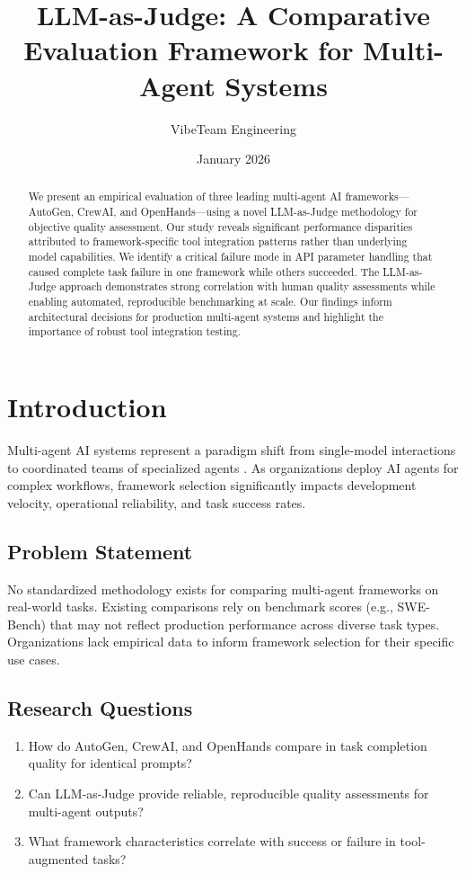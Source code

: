 \documentclass[11pt,a4paper]{article}
\title{LLM-as-Judge: A Comparative Evaluation Framework for Multi-Agent Systems}
\author[1]{VibeTeam Engineering}
\affil[1]{VibeTechnologies, Inc.}
\date{January 2026}
\begin{document}
\maketitle

\begin{abstract}
We present an empirical evaluation of three leading multi-agent AI frameworks---AutoGen, CrewAI, and OpenHands---using a novel LLM-as-Judge methodology for objective quality assessment. Our study reveals significant performance disparities attributed to framework-specific tool integration patterns rather than underlying model capabilities. We identify a critical failure mode in API parameter handling that caused complete task failure in one framework while others succeeded. The LLM-as-Judge approach demonstrates strong correlation with human quality assessments while enabling automated, reproducible benchmarking at scale. Our findings inform architectural decisions for production multi-agent systems and highlight the importance of robust tool integration testing.
\end{abstract}

\section{Introduction}

Multi-agent AI systems represent a paradigm shift from single-model interactions to coordinated teams of specialized agents \citep{wu2023autogen}. As organizations deploy AI agents for complex workflows, framework selection significantly impacts development velocity, operational reliability, and task success rates.

\subsection{Problem Statement}

No standardized methodology exists for comparing multi-agent frameworks on real-world tasks. Existing comparisons rely on benchmark scores (e.g., SWE-Bench) that may not reflect production performance across diverse task types. Organizations lack empirical data to inform framework selection for their specific use cases.

\subsection{Research Questions}

\begin{enumerate}
    \item[\textbf{RQ1}] How do AutoGen, CrewAI, and OpenHands compare in task completion quality for identical prompts?
    \item[\textbf{RQ2}] Can LLM-as-Judge provide reliable, reproducible quality assessments for multi-agent outputs?
    \item[\textbf{RQ3}] What framework characteristics correlate with success or failure in tool-augmented tasks?
\end{enumerate}
\end{document}
